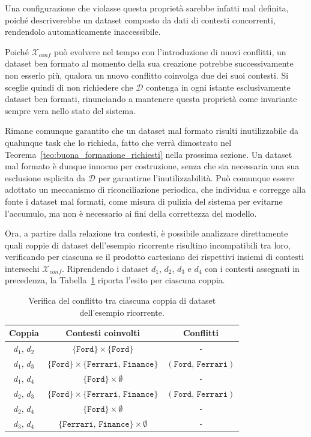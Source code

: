 Una configurazione che violasse questa proprietà sarebbe infatti mal definita, poiché descriverebbe un dataset composto da dati di contesti concorrenti, rendendolo automaticamente inaccessibile.

Poiché $\mathcal{X}_{conf}$ può evolvere nel tempo con l'introduzione di nuovi conflitti, un dataset ben formato al momento della sua creazione potrebbe successivamente non esserlo più, qualora un nuovo conflitto coinvolga due dei suoi contesti. Si sceglie quindi di non richiedere che $\mathcal{D}$ contenga in ogni istante esclusivamente dataset ben formati, rinunciando a mantenere questa proprietà come invariante sempre vera nello stato del sistema.

Rimane comunque garantito che un dataset mal formato risulti inutilizzabile da qualunque task che lo richieda, fatto che verrà dimostrato nel Teorema~\ref{teo:buona_formazione_richiesti} nella prossima sezione. Un dataset mal formato è dunque innocuo per costruzione, senza che sia necessaria una sua esclusione esplicita da $\mathcal{D}$ per garantirne l'inutilizzabilità. Può comunque essere adottato un meccanismo di riconciliazione periodica, che individua e corregge alla fonte i dataset mal formati, come misura di pulizia del sistema per evitarne l'accumulo, ma non è necessario ai fini della correttezza del modello.

Ora, a partire dalla relazione tra contesti, è possibile analizzare direttamente quali coppie di dataset dell'esempio ricorrente risultino incompatibili tra loro, verificando per ciascuna se il prodotto cartesiano dei rispettivi insiemi di contesti intersechi $\mathcal{X}_{conf}$. Riprendendo i dataset $d_1$, $d_2$, $d_3$ e $d_4$ con i contesti assegnati in precedenza, la Tabella~\ref{tab:conflitto_dataset} riporta l'esito per ciascuna coppia.

\begin{table}[ht]
    \centering
    \begin{tabular}{ccc}
        \toprule
        \textbf{Coppia} & \textbf{Contesti coinvolti} & \textbf{Conflitti} \\
        \midrule
        $d_1,\, d_2$ & $\{\mathtt{Ford}\} \times \{\mathtt{Ford}\}$ & \texttt{-} \\
        $d_1,\, d_3$ & $\{\mathtt{Ford}\} \times \{\mathtt{Ferrari},\, \mathtt{Finance}\}$ & $(\mathtt{Ford},\, \mathtt{Ferrari})$ \\
        $d_1,\, d_4$ & $\{\mathtt{Ford}\} \times \emptyset$ & \texttt{-} \\
        $d_2,\, d_3$ & $\{\mathtt{Ford}\} \times \{\mathtt{Ferrari},\, \mathtt{Finance}\}$ & $(\mathtt{Ford},\, \mathtt{Ferrari})$ \\
        $d_2,\, d_4$ & $\{\mathtt{Ford}\} \times \emptyset$ & \texttt{-} \\
        $d_3,\, d_4$ & $\{\mathtt{Ferrari},\, \mathtt{Finance}\} \times \emptyset$ & \texttt{-} \\
        \bottomrule
    \end{tabular}
    \caption{Verifica del conflitto tra ciascuna coppia di dataset dell'esempio ricorrente.}
    \label{tab:conflitto_dataset}
\end{table}

